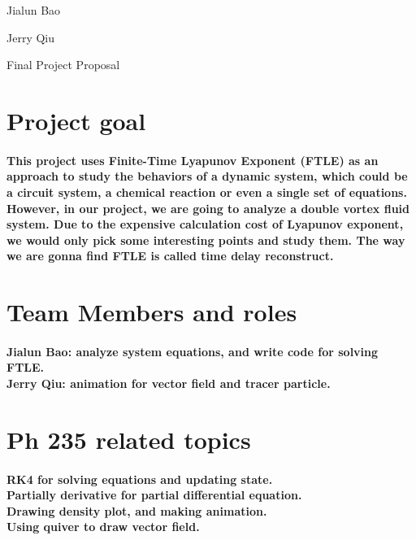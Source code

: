 \documentclass[12pt]{article}
\begin{document}
Jialun Bao 

Jerry Qiu  \\

\begin{center}
Final Project Proposal
\end{center}

\section{Project goal} 
\paragraph{
\indent This project uses Finite-Time Lyapunov Exponent (FTLE) as an approach to study the behaviors of a dynamic system, which could be a circuit system, a chemical reaction or even a single set of equations. However, in our project, we are going to analyze a double vortex fluid system. Due to the expensive calculation cost of Lyapunov exponent, we would only pick some interesting points and study them. The way we are gonna find FTLE is called time delay reconstruct.\\
	}
	



\section{Team Members and roles}
\paragraph{Jialun Bao:
 analyze system equations, and write code for solving FTLE.\\
Jerry Qiu:  animation for vector field and tracer particle.\\
}	



\section{Ph 235 related topics}
\paragraph{	
RK4 for solving equations and updating state.\\
Partially derivative for partial differential equation.\\
Drawing density plot, and making animation.\\ 
Using quiver to draw vector field.\\
}
\end{document}
